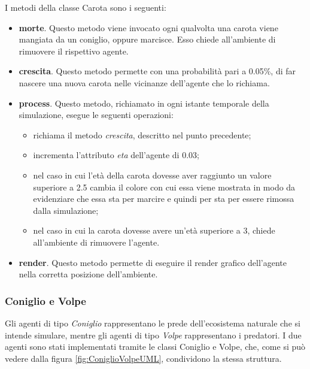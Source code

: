 \documentclass[11pt]{article}
\begin{document}
I metodi della classe Carota sono i seguenti:
\begin{itemize}
    \item \textbf{morte}. Questo metodo viene invocato ogni qualvolta una carota viene mangiata da un coniglio, oppure marcisce. Esso chiede all'ambiente di rimuovere il rispettivo agente. 
    \item \textbf{crescita}. Questo metodo permette con una probabilità pari a 0.05\%, di far nascere una nuova carota nelle vicinanze dell'agente che lo richiama.
    \item \textbf{process}. Questo metodo, richiamato in ogni istante temporale della simulazione, esegue le seguenti operazioni: 
    \begin{itemize}
        \item richiama il metodo \emph{crescita}, descritto nel punto precedente;
        \item incrementa l'attributo \emph{eta} dell'agente di 0.03;
        \item nel caso in cui l'età della carota dovesse aver raggiunto un valore superiore a 2.5 cambia il colore con cui essa viene mostrata in modo da evidenziare che essa sta per marcire e quindi per sta per essere rimossa dalla simulazione;
        \item nel caso in cui la carota dovesse avere un'età superiore a 3, chiede all'ambiente di rimuovere l'agente. 
    \end{itemize}
    \item \textbf{render}. Questo metodo permette di eseguire il render grafico dell'agente nella corretta posizione dell'ambiente. 
\end{itemize}

\subsubsection{Coniglio e Volpe}
Gli agenti di tipo \emph{Coniglio} rappresentano le prede dell'ecosistema naturale che si intende simulare, mentre gli agenti di tipo \emph{Volpe} rappresentano i predatori. I due agenti sono stati implementati tramite le classi Coniglio e Volpe, che, come si può vedere dalla figura \ref{fig:ConiglioVolpeUML}, condividono la stessa struttura. 
\end{document}
